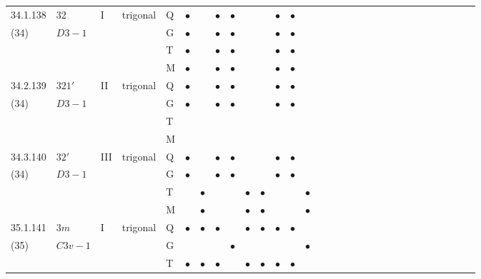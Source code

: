 \documentclass[fleqn,9pt,landscape]{jsarticle}
\begin{document}
\begin{longtable}{lllll|l|l|l|l|l|l|l|l|l|ll|ll|ll|ll|ll|ll|ll|ll}
34.1.138 & \texttt{$32$} & I & trigonal & Q & $\bullet$ &  & $\bullet$ & $\bullet$ &  &  & $\bullet$ & $\bullet$ &  &  &  &  &  &  &  &  &  &  &  &  &  &  &  &  &  \\
(34) & $D3-1$ &  &  & G & $\bullet$ &  & $\bullet$ & $\bullet$ &  &  & $\bullet$ & $\bullet$ &  &  &  &  &  &  &  &  &  &  &  &  &  &  &  &  &  \\
 &  &  &  & T & $\bullet$ &  & $\bullet$ & $\bullet$ &  &  & $\bullet$ & $\bullet$ &  &  &  &  &  &  &  &  &  &  &  &  &  &  &  &  &  \\
 &  &  &  & M & $\bullet$ &  & $\bullet$ & $\bullet$ &  &  & $\bullet$ & $\bullet$ &  &  &  &  &  &  &  &  &  &  &  &  &  &  &  &  &  \\ \hline
34.2.139 & \texttt{$321'$} & II & trigonal & Q & $\bullet$ &  & $\bullet$ & $\bullet$ &  &  & $\bullet$ & $\bullet$ &  &  &  &  &  &  &  &  &  &  &  &  &  &  &  &  &  \\
(34) & $D3-1$ &  &  & G & $\bullet$ &  & $\bullet$ & $\bullet$ &  &  & $\bullet$ & $\bullet$ &  &  &  &  &  &  &  &  &  &  &  &  &  &  &  &  &  \\
 &  &  &  & T &  &  &  &  &  &  &  &  &  &  &  &  &  &  &  &  &  &  &  &  &  &  &  &  &  \\
 &  &  &  & M &  &  &  &  &  &  &  &  &  &  &  &  &  &  &  &  &  &  &  &  &  &  &  &  &  \\ \hline
34.3.140 & \texttt{$32'$} & III & trigonal & Q & $\bullet$ &  & $\bullet$ & $\bullet$ &  &  & $\bullet$ & $\bullet$ &  &  &  &  &  &  &  &  &  &  &  &  &  &  &  &  &  \\
(34) & $D3-1$ &  &  & G & $\bullet$ &  & $\bullet$ & $\bullet$ &  &  & $\bullet$ & $\bullet$ &  &  &  &  &  &  &  &  &  &  &  &  &  &  &  &  &  \\
 &  &  &  & T &  & $\bullet$ &  &  & $\bullet$ & $\bullet$ &  &  & $\bullet$ &  &  &  &  &  &  &  &  &  &  &  &  &  &  &  &  \\
 &  &  &  & M &  & $\bullet$ &  &  & $\bullet$ & $\bullet$ &  &  & $\bullet$ &  &  &  &  &  &  &  &  &  &  &  &  &  &  &  &  \\ \hline
35.1.141 & \texttt{$3m$} & I & trigonal & Q & $\bullet$ & $\bullet$ & $\bullet$ &  & $\bullet$ & $\bullet$ & $\bullet$ & $\bullet$ &  &  &  &  &  &  &  &  &  &  &  &  &  &  &  &  &  \\
(35) & $C3v-1$ &  &  & G &  &  &  & $\bullet$ &  &  &  &  & $\bullet$ &  &  &  &  &  &  &  &  &  &  &  &  &  &  &  &  \\
 &  &  &  & T & $\bullet$ & $\bullet$ & $\bullet$ &  & $\bullet$ & $\bullet$ & $\bullet$ & $\bullet$ &  &  &  &  &  &  &  &  &  &  &  &  &  &  &  &  &  \\

\end{longtable}
\end{document}
